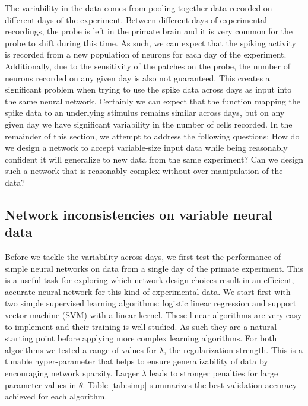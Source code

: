 \documentclass[12pt]{article}
\begin{document}
\indent The variability in the data comes from pooling together data recorded on different days of the experiment. Between different days of experimental recordings, the probe is left in the primate brain and it is very common for the probe to shift during this time. As such, we can expect that the spiking activity is recorded from a new population of neurons for each day of the experiment. Additionally, due to the sensitivity of the patches on the probe, the number of neurons recorded on any given day is also not guaranteed. This creates a significant problem when trying to use the spike data across days as input into the same neural network. Certainly we can expect that the function mapping the spike data to an underlying stimulus remains similar across days, but on any given day we have significant variability in the number of cells recorded. In the remainder of this section, we attempt to address the following questions: How do we design a network to accept variable-size input data while being reasonably confident it will generalize to new data from the same experiment? Can we design such a network that is reasonably complex without over-manipulation of the data?

\subsection{Network inconsistencies on variable neural data}
\indent Before we tackle the variability across days, we first test the performance of simple neural networks on data from a single day of the primate experiment. This is a useful task for exploring which network design choices result in an efficient, accurate neural network for this kind of experimental data. We start first with two simple supervised learning algorithms:  logistic linear regression and support vector machine (SVM) with a linear kernel. These linear algorithms are very easy to implement and their training is well-studied. As such they are a natural starting point before applying more complex learning algorithms. For both algorithms we tested a range of values for $\lambda$, the regularization strength. This is a tunable hyper-parameter that helps to ensure generalizability of data by encouraging network sparsity. Larger $\lambda$ leads to stronger penalties for large parameter values in $\theta$. Table \ref{tab:simp} summarizes the best validation accuracy achieved for each algorithm. \\
\end{document}
